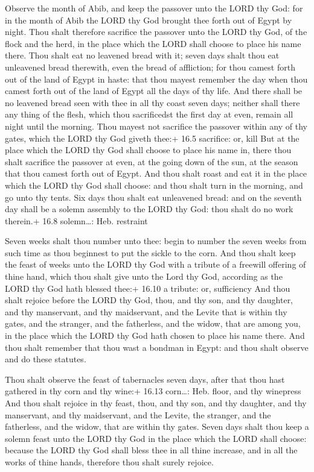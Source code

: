  Observe the month of Abib, and keep the passover unto the
LORD thy God: for in the month of Abib the LORD thy God brought thee
forth out of Egypt by night.  Thou shalt therefore sacrifice
the passover unto the LORD thy God, of the flock and the herd, in the
place which the LORD shall choose to place his name there. 
Thou shalt eat no leavened bread with it; seven days shalt thou eat
unleavened bread therewith, even the bread of affliction; for thou
camest forth out of the land of Egypt in haste: that thou mayest
remember the day when thou camest forth out of the land of Egypt all the
days of thy life.  And there shall be no leavened bread seen
with thee in all thy coast seven days; neither shall there any thing of
the flesh, which thou sacrificedst the first day at even, remain all
night until the morning.  Thou mayest not sacrifice the
passover within any of thy gates, which the LORD thy God giveth thee:+
16.5 sacrifice: or, kill  But at the place which the LORD
thy God shall choose to place his name in, there thou shalt sacrifice
the passover at even, at the going down of the sun, at the season that
thou camest forth out of Egypt.  And thou shalt roast and
eat it in the place which the LORD thy God shall choose: and thou shalt
turn in the morning, and go unto thy tents.  Six days thou
shalt eat unleavened bread: and on the seventh day shall be a solemn
assembly to the LORD thy God: thou shalt do no work therein.+ 16.8
solemn\ldots: Heb. restraint

 Seven weeks shalt thou number unto thee: begin to number
the seven weeks from such time as thou beginnest to put the sickle to
the corn.  And thou shalt keep the feast of weeks unto the
LORD thy God with a tribute of a freewill offering of thine hand, which
thou shalt give unto the Lord thy God, according as the LORD thy God
hath blessed thee:+ 16.10 a tribute: or, sufficiency  And
thou shalt rejoice before the LORD thy God, thou, and thy son, and thy
daughter, and thy manservant, and thy maidservant, and the Levite that
is within thy gates, and the stranger, and the fatherless, and the
widow, that are among you, in the place which the LORD thy God hath
chosen to place his name there.  And thou shalt remember
that thou wast a bondman in Egypt: and thou shalt observe and do these
statutes.

 Thou shalt observe the feast of tabernacles seven days,
after that thou hast gathered in thy corn and thy wine:+ 16.13
corn\ldots: Heb. floor, and thy winepress  And thou shalt
rejoice in thy feast, thou, and thy son, and thy daughter, and thy
manservant, and thy maidservant, and the Levite, the stranger, and the
fatherless, and the widow, that are within thy gates. 
Seven days shalt thou keep a solemn feast unto the LORD thy God in the
place which the LORD shall choose: because the LORD thy God shall bless
thee in all thine increase, and in all the works of thine hands,
therefore thou shalt surely rejoice.

